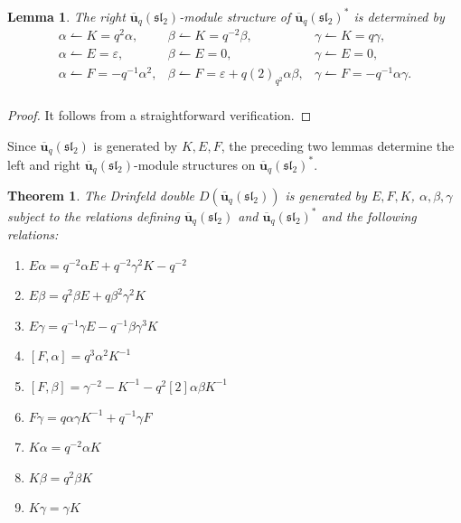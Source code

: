 \documentclass[10pt,oneside]{amsart}
\newcommand{\uq}{\mathbf{\overline{u}}_q(\mathfrak{sl_2})}
\newtheorem{lemma}[proposition]{Lemma}
\newtheorem{theorem}[proposition]{Theorem}
\theoremstyle{definition}
\def\a{\alpha}
\def\b{\beta}
\def\g{\gamma}
\begin{document}
\begin{lemma}\label{2.14}
The right $\mathbf{\overline{u}}_q(\mathfrak{sl_2})$-module structure of $\mathbf{\overline{u}}_q(\mathfrak{sl_2})^*$ is determined by
$$\begin{array}{rcl}
\a\leftharpoonup K=q^2\a, &\b \leftharpoonup K=q^{-2}\b, &\g\leftharpoonup K=q\g,\\
\a\leftharpoonup E=\varepsilon, &\b\leftharpoonup E=0, &\g\leftharpoonup E=0,\\
\a\leftharpoonup F=-q^{-1}\a^2, &\b\leftharpoonup F=\varepsilon+q(2)_{q^2}\a\b, &\g\leftharpoonup F=-q^{-1}\a\g.\\
\end{array}$$
\end{lemma}
\begin{proof}
It follows from a straightforward verification.
\end{proof}
Since $\uq$ is generated by $K,E,F$, the preceding two lemmas determine the left and right $\uq$-module structures on $\uq^*$.
\begin{theorem}\label{2.16}
The Drinfeld double $D(\mathbf{\overline{u}}_q(\mathfrak{sl_2}))$ is generated by $E, F, K$, $\a,\b,\g$ subject to the relations defining $\mathbf{\overline{u}}_q(\mathfrak{sl_2})$ and $\mathbf{\overline{u}}_q(\mathfrak{sl_2})^*$ and the following relations:
\begin{enumerate}
\item[(a)]
$E \a=q^{-2}\a E+q^{-2}\g^2K-q^{-2}$
\item[(b)]
$E\b=q^2\b E+q\b^2\g^2K$
\item[(c)]
$E\g=q^{-1}\g E-q^{-1}\b\g^3 K$

\item[(d)]
$[F,\a]=q^{3}\a^2K^{-1}$
\item[(e)]
$[F,\b]=\g^{-2}-K^{-1}-q^2[2]\a\b K^{-1}$
\item[(f)]
$F\g=q\a\g K^{-1}+q^{-1}\g F$


\item[(g)]
$K\a=q^{-2}\a K$
\item[(h)]
$K \b=q^2\b K$
\item[(i)]
$K\g=\g K$
\end{enumerate}
\end{theorem}
\end{document}

